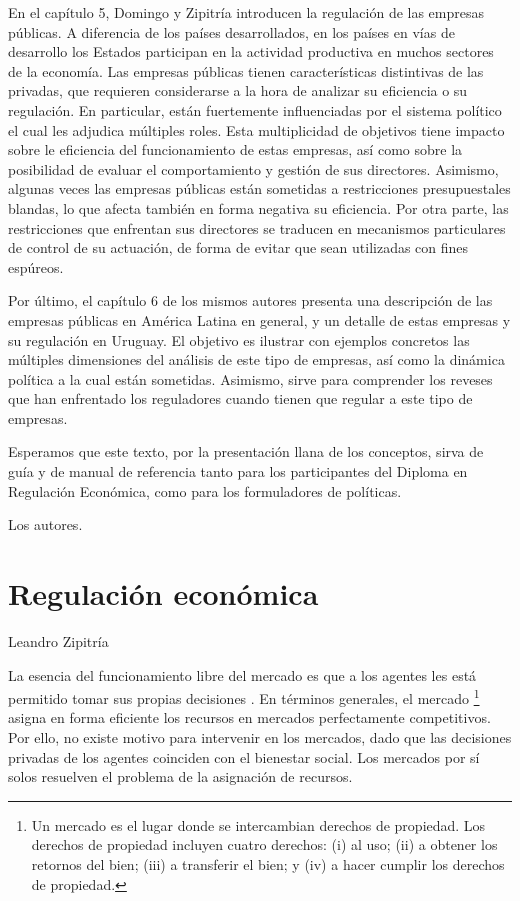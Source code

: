 \documentclass[
  12pt,
  spanish,
]{book}
\begin{document}
En el capítulo 5, Domingo y Zipitría introducen la regulación de las empresas públicas. A diferencia de los países desarrollados, en los países en vías de desarrollo los Estados participan en la actividad productiva en muchos sectores de la economía. Las empresas públicas tienen características distintivas de las privadas, que requieren considerarse a la hora de analizar su eficiencia o su regulación. En particular, están fuertemente influenciadas por el sistema político el cual les adjudica múltiples roles. Esta multiplicidad de objetivos tiene impacto sobre le eficiencia del funcionamiento de estas empresas, así como sobre la posibilidad de evaluar el comportamiento y gestión de sus directores. Asimismo, algunas veces las empresas públicas están sometidas a restricciones presupuestales blandas, lo que afecta también en forma negativa su eficiencia. Por otra parte, las restricciones que enfrentan sus directores se traducen en mecanismos particulares de control de su actuación, de forma de evitar que sean utilizadas con fines espúreos.

Por último, el capítulo 6 de los mismos autores presenta una descripción de las empresas públicas en América Latina en general, y un detalle de estas empresas y su regulación en Uruguay. El objetivo es ilustrar con ejemplos concretos las múltiples dimensiones del análisis de este tipo de empresas, así como la dinámica política a la cual están sometidas. Asimismo, sirve para comprender los reveses que han enfrentado los reguladores cuando tienen que regular a este tipo de empresas.

Esperamos que este texto, por la presentación llana de los conceptos, sirva de guía y de manual de referencia tanto para los participantes del Diploma en Regulación Económica, como para los formuladores de políticas.

Los autores.

\hypertarget{reg-ec}{%
\chapter{Regulación económica}\label{reg-ec}}

Leandro Zipitría

La esencia del funcionamiento libre del mercado es que a los agentes les está permitido tomar sus propias decisiones \citep[357]{Viscusi2005}. En términos generales, el mercado
\footnote{Un mercado es el lugar donde se intercambian derechos de propiedad. Los derechos de propiedad incluyen cuatro derechos: (i) al uso; (ii) a obtener los retornos del bien; (iii) a transferir el bien; y (iv) a hacer cumplir los derechos de propiedad.}
asigna en forma eficiente los recursos en mercados perfectamente competitivos. Por ello, no existe motivo para intervenir en los mercados, dado que las decisiones privadas de los agentes coinciden con el bienestar social. Los mercados por sí solos resuelven el problema de la asignación de recursos.
\end{document}
